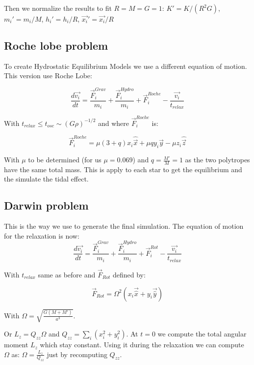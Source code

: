 \documentclass[notes.tex]{subfiles}
\begin{document}
Then we normalize the results to fit $R = M = G = 1$: $K' = K/(R^2G) $, $m_i' = m_i/M $, $h_i' = h_i / R$, $\vec{x_i}' = \vec{x_i}/R$


\subsection{Roche lobe problem}

To create Hydrostatic Equilibrium Models we use a different equation of motion. This version use Roche Lobe:

\begin{equation}
\frac{d\vec{v_i}}{dt} = \frac{\vec{F}_i^{Grav}}{m_i} + \frac{\vec{F}_i^{Hydro}}{m_i} + \vec{F}_i^{Roche} - \frac{\vec{v_i}}{t_{relax}}
\end{equation}


With $t_{relax} \leq t_{osc} \sim (G\rho)^{-1/2}$ and
where $\vec{F}_i^{Roche}$ is:

$$\vec{F}_i^{Roche} = \mu (3+q) x_i \hat{\vec{x}} + \mu q y_i \hat{\vec{y}}-\mu z_i \hat{\vec{z}}$$

With $\mu$ to be determined (for us $\mu = 0.069$) and $q = \frac{M'}{M}=1$ as the two polytropes have the same total mass.
This is apply to each star to get the equilibrium and the simulate the tidal effect.

\subsection{Darwin problem}

This is the way we use to generate the final simulation.
The equation of motion for the relaxation is now:
\begin{equation}
\label{eq:darwin}
\frac{d\vec{v_i}}{dt} = \frac{\vec{F}_i^{Grav}}{m_i} +\frac{\vec{F}_i^{Hydro}}{m_i} + \vec{F}_i^{Rot} - \frac{\vec{v_i}}{t_{relax}}
\end{equation}

With $t_{relax}$ same as before and $\vec{F}_{Rot}$ defined by:

\begin{equation}
\vec{F}_{Rot} = \Omega^2(x_i \vec{\hat{x}}+y_i\vec{\hat{y}})
\end{equation}

With $\Omega = \sqrt{\frac{G(M+M')}{a^3}}$.

Or $L_z = Q_{zz}\Omega$ and $Q_{zz} = \sum_i(x_i^2+y_i^2)$. At $t=0$ we compute the total angular moment $L_z$ which stay constant.
Using it during the relaxation we can compute $\Omega$ as: $\Omega = \frac{L_z}{Q_{zz}}$ just by recomputing $Q_{zz}$.
\end{document}
